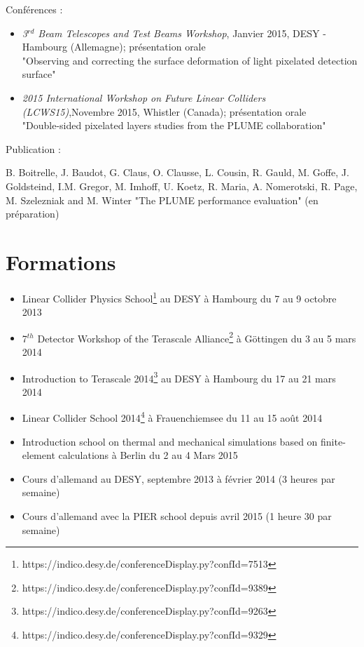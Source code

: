   Conférences :
  \begin{itemize}
    \item \textit{3$^{rd}$ Beam Telescopes and Test Beams Workshop}, Janvier 2015, DESY - Hambourg (Allemagne); présentation orale\\
    "Observing and correcting the surface deformation of light pixelated detection surface"
    \item \textit{2015 International Workshop on Future Linear Colliders (LCWS15)},Novembre 2015,  Whistler (Canada); présentation orale\\
    "Double-sided pixelated layers studies from the PLUME collaboration"
  \end{itemize}
  Publication :
  
  B. Boitrelle, J. Baudot, G. Claus, O. Clausse, L. Cousin, R. Gauld, M. Goffe, J. Goldsteind, I.M. Gregor, M. Imhoff, U. Koetz, R. Maria, A. Nomerotski, R. Page, M. Szelezniak and M. Winter "The PLUME performance evaluation" (en préparation)

  \section*{Formations}
 
  \begin{itemize}
    \item Linear Collider Physics School\footnote{https://indico.desy.de/conferenceDisplay.py?confId=7513} au DESY à Hambourg du 7 au 9 octobre 2013
    \item 7$^{th}$ Detector Workshop of the Terascale Alliance\footnote{https://indico.desy.de/conferenceDisplay.py?confId=9389} à Göttingen du 3 au 5 mars 2014
    \item Introduction to Terascale 2014\footnote{https://indico.desy.de/conferenceDisplay.py?confId=9263} au DESY à Hambourg du 17 au 21 mars 2014
    \item Linear Collider School 2014\footnote{https://indico.desy.de/conferenceDisplay.py?confId=9329} à Frauenchiemsee du 11 au 15 août 2014
    \item Introduction school on thermal and mechanical simulations based on finite-element calculations à Berlin du 2 au 4 Mars 2015
    \item Cours d'allemand au DESY, septembre 2013 à février 2014 (3 heures par semaine)
    \item Cours d'allemand avec la PIER school depuis avril 2015 (1 heure 30 par semaine)
  \end{itemize}
